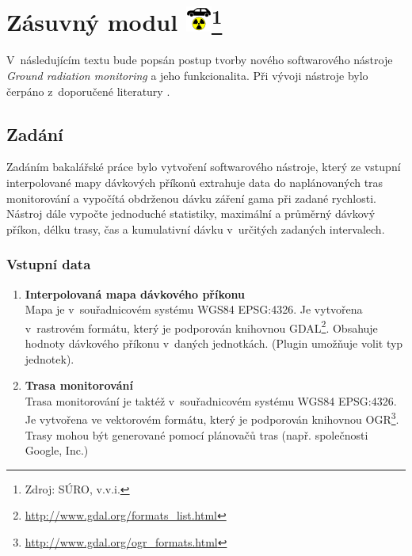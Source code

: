 \chapter[Zásuvný modul]{Zásuvný
modul \includegraphics[scale=0.65]{./pictures/ikonka.png}\footnote{Zdroj:
SÚRO, v.v.i.}}
\label{4-plugin}

V~následujícím textu bude popsán postup tvorby nového softwarového
nástroje \textit{Ground radiation monitoring} a jeho
funkcionalita. Při vývoji nástroje bylo čerpáno z~doporučené
literatury \cite{masteringQgis} \cite{diveIntoPython} \cite{rapidPyQt}.

\section{Zadání} Zadáním bakalářské práce bylo vytvoření softwarového
nástroje, který ze vstupní interpolované mapy dávkových příkonů
extrahuje data do naplánovaných tras moni\-torování a vypočítá obdrženou
dávku záření gama při zadané rychlosti. Nástroj dále vypočte
jednoduché statistiky, maximální a průměrný dávkový příkon, délku
trasy, čas a kumulativní dávku v~určitých zadaných intervalech.

\subsection{Vstupní data}
\label{subsec:vstupniData}
\begin{enumerate}
	\item \textbf{Interpolovaná mapa dávkového příkonu} \\ Mapa je
v~souřadnicovém systému WGS84 EPSG:4326. Je vytvořena v~rastrovém
formátu, který je podporován knihovnou
GDAL\footnote{\url{http://www.gdal.org/formats\_list.html}}. Obsahuje
hodnoty dávkového příkonu v~daných jednotkách. (Plugin umožňuje volit
typ jednotek).
	\item \textbf{Trasa monitorování} \\ Trasa monitorování je
taktéž v~souřadnicovém systému WGS84 EPSG:4326. Je vytvořena ve
vektorovém formátu, který je podporován knihovnou
OGR\footnote{\url{http://www.gdal.org/ogr\_formats.html}}. Trasy mohou být
generované pomocí plánovačů tras (např. společnosti Google, Inc.)
\end{enumerate}


